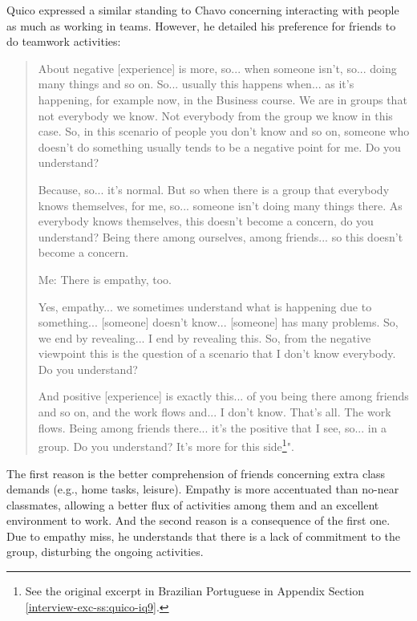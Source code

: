 Quico expressed a similar standing to Chavo concerning interacting with people as much as working in teams. However, he detailed his preference for friends to do teamwork activities:
\begin{quote}
    About negative [experience] is more, so... when someone isn't, so... doing many things and so on. So... usually this happens when... as it's happening, for example now, in the Business course. We are in groups that not everybody we know. Not everybody from the group we know in this case. So, in this scenario of people you don't know and so on, someone who doesn't do something usually tends to be a negative point for me. Do you understand? 

    Because, so... it's normal. But so when there is a group that everybody knows themselves, for me, so... someone isn't doing many things there. As everybody knows themselves, this doesn't become a concern, do you understand? Being there among ourselves, among friends... so this doesn't become a concern.

    \colorbox{black!15}{Me: There is empathy, too.}

    Yes, empathy... we sometimes understand what is happening due to something... [someone] doesn't know... [someone] has many problems. So, we end by revealing... I end by revealing this. So, from the negative viewpoint this is the question of a scenario that I don't know everybody. Do you understand?

    And positive [experience] is exactly this... of you being there among friends and so on, and the work flows and... I don't know. That's all. The work flows. Being among friends there... it's the positive that I see, so... in a group. Do you understand? It's more for this side\footnote{See the original excerpt in Brazilian Portuguese in Appendix Section \ref{interview-exc-ss:quico-iq9}.}".
\end{quote}
The first reason is the better comprehension of friends concerning extra class demands (e.g., home tasks, leisure). Empathy is more accentuated than no-near classmates, allowing a better flux of activities among them and an excellent environment to work. And the second reason is a consequence of the first one. Due to empathy miss, he understands that there is a lack of commitment to the group, disturbing the ongoing activities.

